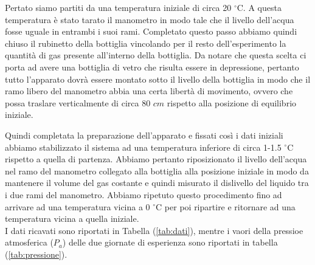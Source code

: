 Pertato siamo partiti da una temperatura iniziale di circa 20 $^\circ$C. A questa temperatura è stato tarato il manometro in modo tale che il livello dell'acqua fosse uguale in entrambi i suoi rami. Completato questo passo abbiamo quindi chiuso il rubinetto della bottiglia vincolando per il resto dell'esperimento la quantità di gas presente all'interno della bottiglia. Da notare che questa scelta ci porta ad avere una bottiglia di vetro che risulta essere in depressione, pertanto tutto l'apparato dovrà essere montato sotto il livello della bottiglia in modo che il ramo libero del manometro abbia una certa libertà di movimento, ovvero che possa traslare verticalmente di circa 80 $cm$ rispetto alla posizione di equilibrio iniziale.

Quindi completata la preparazione dell'apparato e fissati così i dati iniziali abbiamo stabilizzato il sistema ad una temperatura inferiore di circa 1-1.5 $^\circ$C rispetto a quella di partenza. Abbiamo pertanto riposizionato il livello dell'acqua nel ramo del manometro collegato alla bottiglia alla posizione iniziale in modo da mantenere il volume del gas costante e quindi misurato il dislivello del liquido tra i due rami del manometro.
Abbiamo ripetuto questo procedimento fino ad arrivare ad una temperatura vicina a 0 $^\circ$C per poi ripartire e ritornare ad una temperatura vicina a quella iniziale.\\

I dati ricavati sono riportati in Tabella (\ref{tab:dati}), mentre i vaori della pressioe atmosferica ($P_a$) delle due giornate di esperienza sono riportati in tabella (\ref{tab:pressione}).


